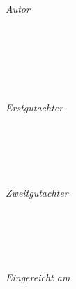 \begin{titlepage}
	\vfill
  \begin{minipage}[t]{.8\textwidth}
    \centering
    {\LARGE \color{ctcolortitle}\textbf{\thesisTitle} \\[10mm]}
	  {\Large \thesisSubtitle} \\
  \end{minipage}
	\vfill
	\begin{minipage}[t]{.27\textwidth}
		\raggedleft
		\textit{Autor}
	\end{minipage}
	\hspace*{15pt}
	\begin{minipage}[t]{.65\textwidth}
		{\Large \thesisAuthor} \\
	  	{\thesisAuthorStudentNumber} \\
	  	{\thesisAuthorEmail} \\
    \end{minipage} \\[5mm]
    \begin{minipage}[t]{.27\textwidth}
		\raggedleft
		\textit{Erstgutachter}
	\end{minipage}
	\hspace*{15pt}
	\begin{minipage}[t]{.65\textwidth}
		{\Large \thesisFirstReviewer} \\
	  	{\thesisFirstReviewerEmail} \\
	\end{minipage} \\[5mm]
	\begin{minipage}[t]{.27\textwidth}
		\raggedleft
		\textit{Zweitgutachter}
	\end{minipage}
	\hspace*{15pt}
	\begin{minipage}[t]{.65\textwidth}
		{\Large \thesisSecondReviewer} \\
	  	{\thesisSecondReviewerEmail} \\
	\end{minipage} \\[10mm]
	\begin{minipage}[t]{.27\textwidth}
		\raggedleft
		\textit{Eingereicht am}
	\end{minipage}
	\hspace*{15pt}
	\begin{minipage}[t]{.65\textwidth}
		\thesisDate
	\end{minipage} \\

\end{titlepage}


